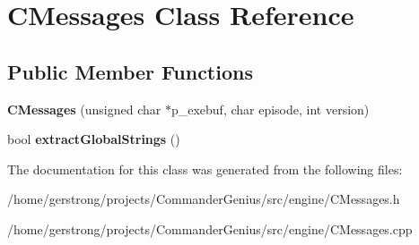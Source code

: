 \hypertarget{class_c_messages}{
\section{CMessages Class Reference}
\label{class_c_messages}
}
\subsection*{Public Member Functions}
\begin{DoxyCompactItemize}
\item 
\hypertarget{class_c_messages_a522ba47ed00c62509c392a5f65b97a44}{
{\bfseries CMessages} (unsigned char $\ast$p\_\-exebuf, char episode, int version)}
\label{class_c_messages_a522ba47ed00c62509c392a5f65b97a44}

\item 
\hypertarget{class_c_messages_affd5122f14fcfbae289d6830a0da3668}{
bool {\bfseries extractGlobalStrings} ()}
\label{class_c_messages_affd5122f14fcfbae289d6830a0da3668}

\end{DoxyCompactItemize}


The documentation for this class was generated from the following files:\begin{DoxyCompactItemize}
\item 
/home/gerstrong/projects/CommanderGenius/src/engine/CMessages.h\item 
/home/gerstrong/projects/CommanderGenius/src/engine/CMessages.cpp\end{DoxyCompactItemize}
